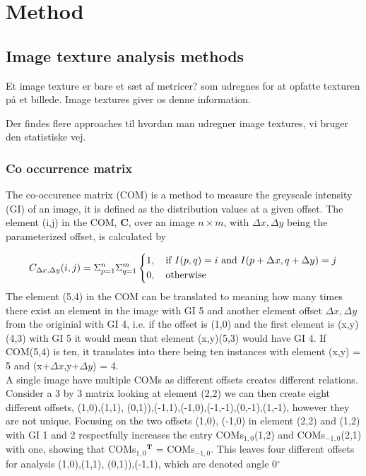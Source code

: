 \chapter{Method}

\section{Image texture analysis methods}



Et image texture er bare et sæt af metricer? som udregnes for at opfatte texturen på et billede. Image textures giver os denne information.

Der findes flere approaches til hvordan man udregner image textures, vi bruger den statistiske vej.

\subsection{Co occurrence matrix}
The co-occurence matrix (COM) is a method to measure the greyscale intensity (GI) of an image, it is defined as the distribution values at a given offset. The element (i,j) in the COM, \textbf{C}, over an image $n \times m$, with $\Delta x, \Delta y$ being the parameterized offset, is calculated by

\[
C_{\Delta x, \Delta y}(i, j) = \Sigma_{p=1}^n\Sigma_{q=1}^m
\begin{dcases}
  1, \quad \text{if } I(p,q)=i \text{ and } I(p+\Delta x, q+ \Delta y) =j \\
  0, \quad \text{otherwise}
\end{dcases}
\]
The element (5,4) in the COM can be translated to meaning how many times there exist an element in the image with GI  5 and another element offset $\Delta x, \Delta y$ from the originial with GI 4, i.e. if the offset is (1,0) and the first element is (x,y)(4,3) with GI 5 it would mean that element (x,y)(5,3) would have GI 4. If COM(5,4) is ten, it translates into there being ten instances with element (x,y) = 5 and (x+$\Delta x$,y+$\Delta y$) = 4.\\
A single image have multiple COMs as different offsets creates different relations. Consider a 3 by 3 matrix looking at element (2,2) we can then create eight different offsets, {(1,0),(1,1), (0,1)),(-1,1),(-1,0),(-1,-1),(0,-1),(1,-1)}, however they are not unique. 
Focusing on the two offsets {(1,0), (-1,0)} in element (2,2) and (1,2) with GI 1 and 2 respectfully increases the entry COMs$_{1,0}$(1,2) and COMs$_{-1,0}$(2,1) with one, showing that COMs$_{1,0}$$^\textbf{T}$ = COMs$_{-1,0}$. This leaves four different offsets for analysis {(1,0),(1,1), (0,1)),(-1,1)}, which are denoted angle 0$^\circ$


